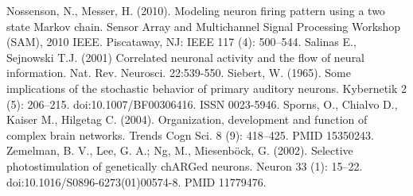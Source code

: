 \documentclass[14pt]{SelfArx} %
\numberwithin{equation}{section}
\begin{document}
\begin{thebibliography}{999}
 Nossenson, N., Messer, H. (2010). Modeling neuron firing pattern using a two state Markov chain. Sensor Array and Multichannel Signal Processing Workshop (SAM), 2010 IEEE. Piscataway, NJ: IEEE 117 (4): 500–544.
 Salinas E., Sejnowski T.J. (2001) Correlated neuronal activity and the flow of neural information. Nat. Rev. Neurosci. 22:539-550.
 Siebert, W. (1965). Some implications of the stochastic behavior of primary auditory neurons. Kybernetik 2 (5): 206–215. doi:10.1007/BF00306416. ISSN 0023-5946.
 Sporns, O., Chialvo D., Kaiser M., Hilgetag C. (2004). Organization, development and function of complex brain networks. Trends Cogn Sci. 8 (9): 418–425. PMID 15350243.
 Zemelman, B. V., Lee, G. A.; Ng, M., Miesenböck, G. (2002). Selective photostimulation of genetically chARGed neurons. Neuron 33 (1): 15–22. doi:10.1016/S0896-6273(01)00574-8. PMID 11779476.
\end{thebibliography}
\end{document}
